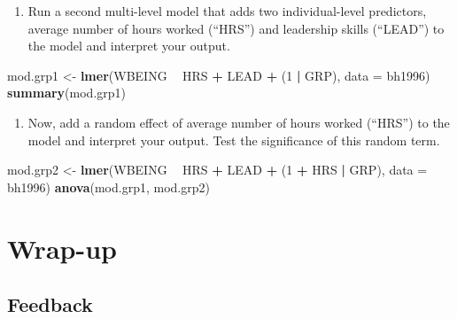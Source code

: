 \documentclass[]{book}
\newenvironment{Shaded}{\begin{snugshade}}{\end{snugshade}}
\newcommand{\KeywordTok}[1]{\textcolor[rgb]{0.13,0.29,0.53}{\textbf{#1}}}
\newcommand{\DataTypeTok}[1]{\textcolor[rgb]{0.13,0.29,0.53}{#1}}
\newcommand{\DecValTok}[1]{\textcolor[rgb]{0.00,0.00,0.81}{#1}}
\newcommand{\StringTok}[1]{\textcolor[rgb]{0.31,0.60,0.02}{#1}}
\newcommand{\OperatorTok}[1]{\textcolor[rgb]{0.81,0.36,0.00}{\textbf{#1}}}
\newcommand{\NormalTok}[1]{#1}
\providecommand{\tightlist}{%
  \setlength{\itemsep}{0pt}\setlength{\parskip}{0pt}}
\begin{document}
\begin{enumerate}
\def\labelenumi{\arabic{enumi}.}
\setcounter{enumi}{2}
\tightlist
\item
  Run a second multi-level model that adds two individual-level
  predictors, average number of hours worked (``HRS'') and leadership
  skills (``LEAD'') to the model and interpret your output.
\end{enumerate}

\begin{Shaded}
\begin{Highlighting}[]
\NormalTok{  mod.grp1 <-}\StringTok{ }\KeywordTok{lmer}\NormalTok{(WBEING }\OperatorTok{~}\StringTok{ }\NormalTok{HRS }\OperatorTok{+}\StringTok{ }\NormalTok{LEAD }\OperatorTok{+}\StringTok{ }\NormalTok{(}\DecValTok{1} \OperatorTok{|}\StringTok{ }\NormalTok{GRP), }\DataTypeTok{data =}\NormalTok{ bh1996)}
  \KeywordTok{summary}\NormalTok{(mod.grp1)}
\end{Highlighting}
\end{Shaded}

\begin{enumerate}
\def\labelenumi{\arabic{enumi}.}
\setcounter{enumi}{2}
\tightlist
\item
  Now, add a random effect of average number of hours worked (``HRS'')
  to the model and interpret your output. Test the significance of this
  random term.
\end{enumerate}

\begin{Shaded}
\begin{Highlighting}[]
\NormalTok{  mod.grp2 <-}\StringTok{ }\KeywordTok{lmer}\NormalTok{(WBEING }\OperatorTok{~}\StringTok{ }\NormalTok{HRS }\OperatorTok{+}\StringTok{ }\NormalTok{LEAD }\OperatorTok{+}\StringTok{ }\NormalTok{(}\DecValTok{1} \OperatorTok{+}\StringTok{ }\NormalTok{HRS }\OperatorTok{|}\StringTok{ }\NormalTok{GRP), }\DataTypeTok{data =}\NormalTok{ bh1996)}
  \KeywordTok{anova}\NormalTok{(mod.grp1, mod.grp2)}
\end{Highlighting}
\end{Shaded}

\section{Wrap-up}\label{wrap-up-1}

\subsection{Feedback}\label{feedback-1}
\end{document}
